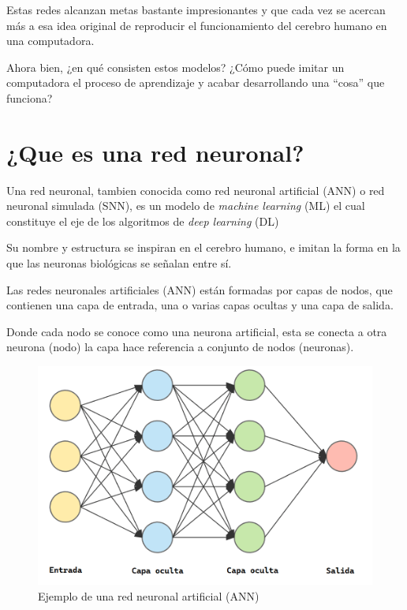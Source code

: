 \documentclass[runningheads]{llncs} %
\begin{document}
Estas redes alcanzan metas bastante impresionantes y que cada vez se acercan 
más a esa idea original de reproducir el funcionamiento del cerebro humano 
en una computadora. 

Ahora bien, ¿en qué consisten estos modelos? ¿Cómo puede imitar un computadora 
el proceso de aprendizaje y acabar desarrollando una
\textquotedblleft{cosa}\textquotedblright{} que funciona? \cite{int2}
\section{¿Que es una red neuronal?}
Una red neuronal, tambien conocida como red neuronal artificial (ANN)
o red neuronal simulada (SNN), es un modelo de \textit{machine learning} (ML)
el cual constituye el eje de los algoritmos de \textit{deep learning} (DL) 

Su nombre y estructura se inspiran en el cerebro humano, 
e imitan la forma en la que las neuronas biológicas se señalan entre sí.

Las redes neuronales artificiales (ANN) están formadas por capas de nodos, 
que contienen una capa de entrada, una o varias capas ocultas y una capa de salida.
\cite{def-ibm1}

Donde cada nodo se conoce como una neurona artificial, esta se conecta a 
otra neurona (nodo) la capa hace referencia a conjunto de nodos (neuronas).

\begin{figure}
    \centering
    \includegraphics[scale=0.6]{red_neuronal_artificial.png}
    \caption{Ejemplo de una red neuronal artificial (ANN) \cite{int1}}
    \label{fig:red_neuronal_artificial}
\end{figure}
\end{document}
